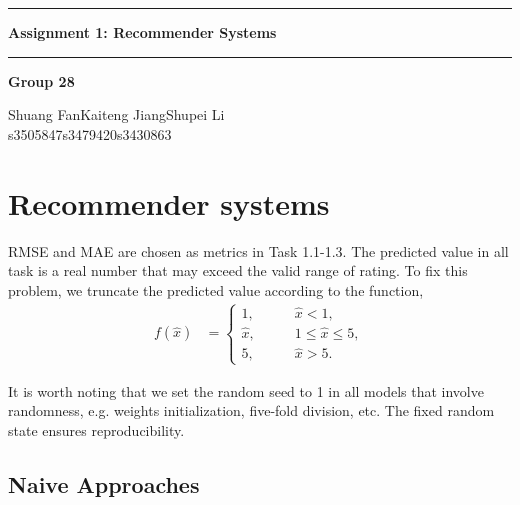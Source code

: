 \documentclass[12pt]{article}
\begin{document}
\noindent\rule{\textwidth}{1pt}
\begin{center}
    \LARGE \textbf{Assignment 1: Recommender Systems}
\end{center}
\noindent\rule{\textwidth}{0.5pt}
\begin{center}
    \textbf{Group 28}\par
    \vspace{0.3cm}
Shuang Fan\phantom{space}Kaiteng Jiang\phantom{space}Shupei Li\\
s3505847\phantom{spacespac}s3479420\phantom{spacespa}s3430863
\end{center}
\section{Recommender systems}
RMSE and MAE are chosen as metrics in Task 1.1-1.3. The predicted value in all task is a real number that may exceed the valid range of rating. To fix this problem, we truncate the predicted value according to the function,
\begin{align*}
    f(\hat{x}) &= 
    \begin{cases}
        1,\qquad &\hat{x} < 1,\\
        \hat{x},\qquad &1\leq \hat{x} \leq 5,\\
        5, \qquad &\hat{x} > 5.
    \end{cases}
\end{align*}
\par
It is worth noting that we set the random seed to 1 in all models that involve randomness, e.g. weights initialization, five-fold division, etc. The fixed random state ensures reproducibility.

\subsection{Naive Approaches}
\end{document}
